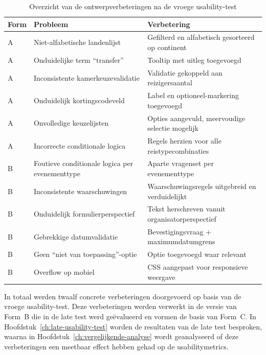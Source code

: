 \begin{table}[h]
  \centering
  \caption[Overzicht ontwerpverbeteringen]{Overzicht van de ontwerpverbeteringen na de vroege usability-test}
  \label{tab:verbeteringen-overzicht}
  \begin{tabular}{lp{5.5cm}p{5cm}}
    \hline
    \textbf{Form} & \textbf{Probleem} & \textbf{Verbetering} \\
    \hline
    A & Niet-alfabetische landenlijst & Gefilterd en alfabetisch gesorteerd op continent \\
    A & Onduidelijke term ``transfer'' & Tooltip met uitleg toegevoegd \\
    A & Inconsistente kamerkeuzevalidatie & Validatie gekoppeld aan reizigersaantal \\
    A & Onduidelijk kortingscodeveld & Label en optioneel-markering toegevoegd \\
    A & Onvolledige keuzelijsten & Opties aangevuld, meervoudige selectie mogelijk \\
    A & Incorrecte conditionale logica & Regels herzien voor alle reistypecombinaties \\
    \hline
    B & Foutieve conditionale logica per evenementtype & Aparte vragenset per evenementtype \\
    B & Inconsistente waarschuwingen & Waarschuwingsregels uitgebreid en verduidelijkt \\
    B & Onduidelijk formulierperspectief & Tekst herschreven vanuit organisatorperspectief \\
    B & Gebrekkige datumvalidatie & Bevestigingsvraag + maximumdatumgrens \\
    B & Geen ``niet van toepassing''-optie & Optie toegevoegd waar relevant \\
    B & Overflow op mobiel & CSS aangepast voor responsieve weergave \\
    \hline
  \end{tabular}
\end{table}

In totaal werden twaalf concrete verbeteringen doorgevoerd op basis van de vroege usability-test. Deze verbeteringen werden verwerkt in de versie van Form~B die in de late test werd geëvalueerd en vormen de basis van Form~C. In Hoofdstuk~\ref{ch:late-usability-test} worden de resultaten van de late test besproken, waarna in Hoofdstuk~\ref{ch:vergelijkende-analyse} wordt geanalyseerd of deze verbeteringen een meetbaar effect hebben gehad op de usabilitymetrics.
